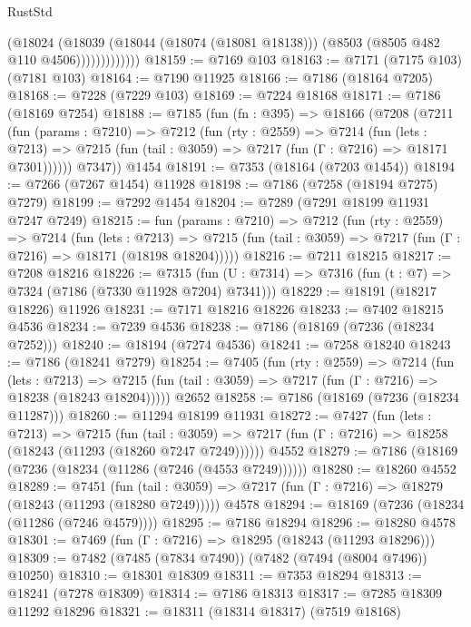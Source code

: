 \begin{lexlean}{RustStd}
\begin{coremodule}
                      (@18024
                        (@18039
                          (@18044 (@18074 (@18081 @18138)))
                          (@8503 (@8505 @482 @110 @4506)))))))))))))
@18159 := @7169 @103
@18163 := @7171 (@7175 @103) (@7181 @103)
@18164 := @7190 @11925
@18166 := @7186 (@18164 @7205)
@18168 := @7228 (@7229 @103)
@18169 := @7224 @18168
@18171 := @7186 (@18169 @7254)
@18188 := @7185
    (fun (fn : @395) =>
    @18166
      (@7208
        (@7211
          (fun (params : @7210) =>
          @7212
            (fun (rty : @2559) =>
            @7214
              (fun (lets : @7213) =>
              @7215 (fun (tail : @3059) => @7217 (fun (Γ : @7216) => @18171 @7301))))))
        @7347))
    @1454
@18191 := @7353 (@18164 (@7203 @1454))
@18194 := @7266 (@7267 @1454) @11928
@18198 := @7186 (@7258 (@18194 @7275) @7279)
@18199 := @7292 @1454
@18204 := @7289 (@7291 @18199 @11931 @7247 @7249)
@18215 := fun (params : @7210) =>
  @7212
    (fun (rty : @2559) =>
    @7214
      (fun (lets : @7213) =>
      @7215 (fun (tail : @3059) => @7217 (fun (Γ : @7216) => @18171 (@18198 @18204)))))
@18216 := @7211 @18215
@18217 := @7208 @18216
@18226 := @7315
    (fun (U : @7314) => @7316 (fun (t : @7) => @7324 (@7186 (@7330 @11928 @7204) @7341)))
@18229 := @18191 (@18217 @18226) @11926
@18231 := @7171 @18216 @18226
@18233 := @7402 @18215 @4536
@18234 := @7239 @4536
@18238 := @7186 (@18169 (@7236 (@18234 @7252)))
@18240 := @18194 (@7274 @4536)
@18241 := @7258 @18240
@18243 := @7186 (@18241 @7279)
@18254 := @7405
    (fun (rty : @2559) =>
    @7214
      (fun (lets : @7213) =>
      @7215 (fun (tail : @3059) => @7217 (fun (Γ : @7216) => @18238 (@18243 @18204)))))
    @2652
@18258 := @7186 (@18169 (@7236 (@18234 @11287)))
@18260 := @11294 @18199 @11931
@18272 := @7427
    (fun (lets : @7213) =>
    @7215
      (fun (tail : @3059) =>
      @7217 (fun (Γ : @7216) => @18258 (@18243 (@11293 (@18260 @7247 @7249))))))
    @4552
@18279 := @7186 (@18169 (@7236 (@18234 (@11286 (@7246 (@4553 @7249))))))
@18280 := @18260 @4552
@18289 := @7451
    (fun (tail : @3059) => @7217 (fun (Γ : @7216) => @18279 (@18243 (@11293 (@18280 @7249)))))
    @4578
@18294 := @18169 (@7236 (@18234 (@11286 (@7246 @4579))))
@18295 := @7186 @18294
@18296 := @18280 @4578
@18301 := @7469 (fun (Γ : @7216) => @18295 (@18243 (@11293 @18296)))
@18309 := @7482 (@7485 (@7834 @7490)) (@7482 (@7494 (@8004 @7496)) @10250)
@18310 := @18301 @18309
@18311 := @7353 @18294
@18313 := @18241 (@7278 @18309)
@18314 := @7186 @18313
@18317 := @7285 @18309 @11292 @18296
@18321 := @18311 (@18314 @18317) (@7519 @18168)

\end{coremodule}
\end{lexlean}
